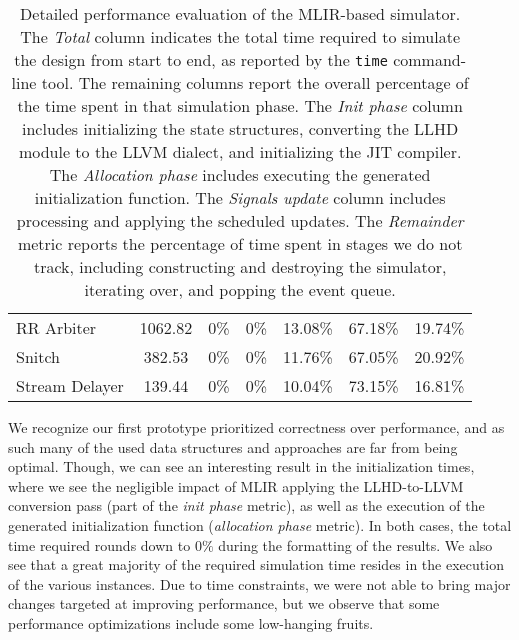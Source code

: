 \begin{table}[ht]
{\begin{tabular}{lcccccc}
      RR Arbiter      & 1062.82            & 0\%                       & 0\%                        & 13.08\%                    & 67.18\%                    & 19.74\%            \\
      Snitch          & 382.53             & 0\%                       & 0\%                        & 11.76\%                    & 67.05\%                    & 20.92\%            \\
      Stream Delayer  & 139.44             & 0\%                       & 0\%                        & 10.04\%                    & 73.15\%                    & 16.81\%            \\
      \bottomrule
    \end{tabular}
  }
  \caption[Detailed performance evaluation of the MLIR-based simulator]{Detailed performance evaluation of the MLIR-based simulator. The \textit{Total} column indicates the total time required to simulate the design from start to end, as reported by the \texttt{time} command-line tool. The remaining columns report the overall percentage of the time spent in that simulation phase. The \textit{Init phase} column includes initializing the state structures, converting the LLHD module to the LLVM dialect, and initializing the JIT compiler. The \textit{Allocation phase} includes executing the generated initialization function. The \textit{Signals update} column includes processing and applying the scheduled updates. The \textit{Remainder} metric reports the percentage of time spent in stages we do not track, including constructing and destroying the simulator, iterating over, and popping the event queue.}
  \label{tab:time_detail0}
\end{table}

We recognize our first prototype prioritized correctness over performance, and as such many of the used data structures and approaches are far from being optimal. Though, we can see an interesting result in the initialization times, where we see the negligible impact of MLIR applying the LLHD-to-LLVM conversion pass (part of the \textit{init phase} metric), as well as the execution of the generated initialization function (\textit{allocation phase} metric). In both cases, the total time required rounds down to $0\%$ during the formatting of the results. We also see that a great majority of the required simulation time resides in the execution of the various instances. Due to time constraints, we were not able to bring major changes targeted at improving performance, but we observe that some performance optimizations include some low-hanging fruits.

